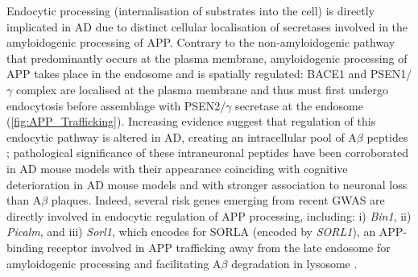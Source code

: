 
Endocytic processing (internalisation of substrates into the cell) is directly implicated in AD due to distinct cellular localisation of secretases involved in the amyloidogenic processing of APP\cite{Acker2019}. Contrary to the non-amyloidogenic pathway that predominantly occurs at the plasma membrane\cite{Sisodia1992}, amyloidogenic processing of APP takes place in the endosome and is spatially regulated: BACE1 and PSEN1/$\gamma$ complex are localised at the plasma membrane and thus must first undergo endocytosis before assemblage with PSEN2/$\gamma$ secretase at the endosome (\cref{fig:APP_Trafficking}). Increasing evidence suggest that regulation of this endocytic pathway is altered in AD, creating an intracellular pool of A$\beta$ peptides \cite{Peric2015}; pathological significance of these intraneuronal peptides have been corroborated in AD mouse models with their appearance coinciding with cognitive deterioration in AD mouse models \cite{Tomiyama2010,Knobloch2007,Billings2005} and with stronger association to neuronal loss than A$\beta$ plaques\cite{Christensen2008}. Indeed, several risk genes emerging from recent GWAS are directly involved in endocytic regulation of APP processing, including: i) \textit{Bin1}, ii) \textit{Picalm}, and iii) \textit{Sorl1}, which encodes for SORLA (encoded by \textit{SORL1}), an APP-binding receptor involved in APP trafficking away from the late endosome for amyloidogenic processing and facilitating A$\beta$ degradation in lysosome \cite{Schmidt2016,Dumanis2015}.   

